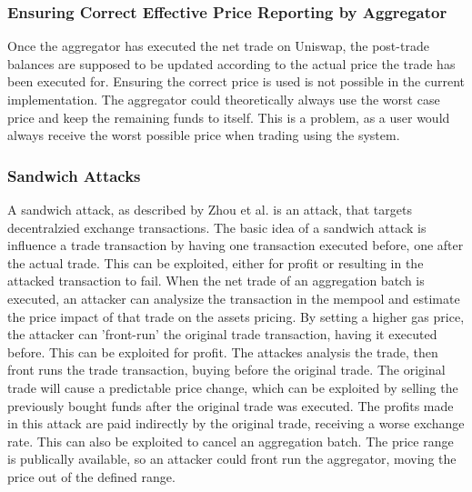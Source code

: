 \documentclass[../../thesis.tex]{subfiles}
\begin{document}
\subsubsection{Ensuring Correct Effective Price Reporting by Aggregator}
Once the aggregator has executed the net trade on Uniswap, the post-trade balances are supposed to be updated according to the actual price the trade has been executed for. Ensuring the correct price is used is not possible in the current implementation. The aggregator could theoretically always use the worst case price and keep the remaining funds to itself. This is a problem, as a user would always receive the worst possible price when trading using the system. 

\subsubsection{Sandwich Attacks}
A sandwich attack, as described by Zhou et al. \cite{zhou2020high} is an attack, that targets decentralzied exchange transactions. The basic idea of a sandwich attack is influence a trade transaction by having one transaction executed before, one after the actual trade. This can be exploited, either for profit or resulting in the attacked transaction to fail. When the net trade of an aggregation batch is executed, an attacker can analysize the transaction in the mempool and estimate the price impact of that trade on the assets pricing. By setting a higher gas price, the attacker can 'front-run' \cite{adams2020uniswap} the original trade transaction, having it executed before. This can be exploited for profit. The attackes analysis the trade, then front runs the trade transaction, buying before the original trade. The original trade will cause a predictable price change, which can be exploited by selling the previously bought funds after the original trade was executed. The profits made in this attack are paid indirectly by the original trade, receiving a worse exchange rate. This can also be exploited to cancel an aggregation batch. The price range is publically available, so an attacker could front run the aggregator, moving the price out of the defined range. 
\end{document}
